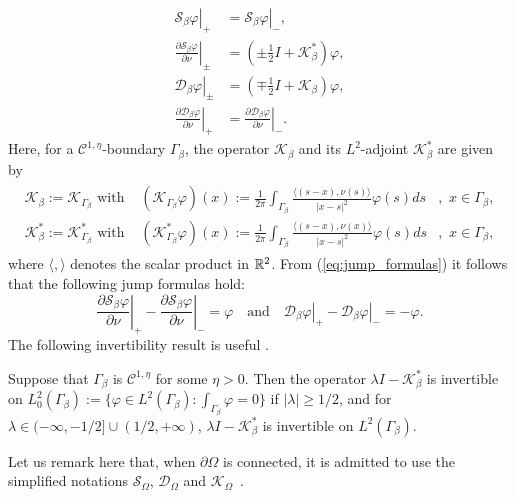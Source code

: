 \begin{equation}
\begin{aligned}\left.\mathcal{S}_{\beta}\varphi\right|_{+} & =\left.\mathcal{S}_{\beta}\varphi\right|_{-},\\
\left.\frac{\partial\mathcal{S}_{\beta}\varphi}{\partial\nu}\right|_{\pm} & =\left(\pm\frac{1}{2}I+\mathcal{K}_{\beta}^{*}\right)\varphi,\\
\left.\mathcal{D}_{\beta}\varphi\right|_{\pm} & =\left(\mp\frac{1}{2}I+\mathcal{K}_{\beta}\right)\varphi,\\
\left.\frac{\partial\mathcal{D}_{\beta}\varphi}{\partial\nu}\right|_{+} & =\left.\frac{\partial\mathcal{D}_{\beta}\varphi}{\partial\nu}\right|_{-}.
\end{aligned}
\label{eq:jump_formulas}
\end{equation}
 Here, for a $\mathcal{C}^{1,\eta}$-boundary $\Gamma_{\beta}$, the operator $\mathcal{K}_{\beta}$ and its $L^{2}$-adjoint
$\mathcal{K}_{\beta}^{*}$ are given by
\begin{equation}
\begin{aligned}\begin{aligned}\mathcal{K}_{\beta} := \mathcal{K}_{\Gamma_\beta} \mbox{ with } & 
(\mathcal{K}_{\Gamma_\beta}\varphi)(x)  :=\frac{1}{2\pi}\int_{\Gamma_{\beta}}\frac{
\langle (s-x) , \nu(s) \rangle}{\left|x-s\right|^{2}}\varphi(s)ds & ,\,\, x\in\Gamma_{\beta},\\
\mathcal{K}_{\beta}^* := \mathcal{K}_{\Gamma_\beta}^* \mbox{ with } & 
(\mathcal{K}_{\Gamma_\beta}^{*}\varphi)(x)  :=\frac{1}{2\pi }
\int_{\Gamma_{\beta}}\frac{ \langle (s-x) , \nu(x) \rangle
}{\left|x-s\right|^{2}}\varphi(s)ds & ,\,\, x\in\Gamma_{\beta},
\end{aligned}
\end{aligned}
\label{eq:def_Neumann_Poincare}
\end{equation}
where $\langle , \rangle$ denotes the scalar product in $\R^2$.
 From (\ref{eq:jump_formulas}) it
follows that the following jump formulas hold:
$$
\left.\frac{\partial\mathcal{S}_{\beta}\varphi}{\partial\nu}\right|_{+}
-
\left.\frac{\partial\mathcal{S}_{\beta}\varphi}{\partial\nu}\right|_{-}
= \varphi \quad \mbox{and} \quad
\left.\mathcal{D}_{\beta}\varphi\right|_{+} -
\left.\mathcal{D}_{\beta}\varphi\right|_{-} = - \varphi.
$$
The following invertibility result is useful
\cite{escauriaza1992,kellogg2010foundations,verchota1984}.
\begin{theorem} \label{theorem:invertibility_lambda_K}Suppose that
$\Gamma_{\beta}$ is $\mathcal{C}^{1,\eta}$ for some $\eta >0$.
Then the operator $\lambda I-\mathcal{K}_{\beta}^{*}$ is
invertible on $L_{0}^{2}(\Gamma_{\beta}):=\{ \varphi \in
L^2(\Gamma_{\beta}) : \int_{\Gamma_\beta} \varphi =0\}$ if
$\left|\lambda\right|\geq1/2$, and for $\lambda\in ( -\infty, -
1/2]\cup (1/2,+\infty)$, $\lambda I-\mathcal{K}_{\beta}^{*}$ is
invertible on $L^{2}(\Gamma_{\beta})$.
\end{theorem} 
Let us remark here that, when $\partial \Omega$ is connected, it is admitted
to use the simplified notations $\mathcal{S}_{\Omega}$, $\mathcal{D}_{\Omega}$ and
$\mathcal{K}_{\Omega}$~\cite{ammarikang2009}.

